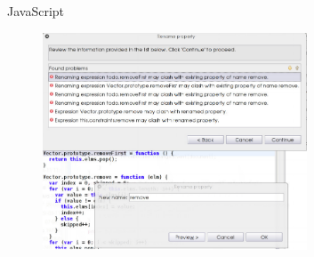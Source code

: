 \documentclass[xcolor=dvipsnames]{beamer}
\begin{document}
\begin{frame}{JavaScript}
  \begin{figure}[htbp]
    \centering
    \includegraphics[width=0.7\textwidth]{img/Javascript.png}
    \label{fig:JavaScript}
  \end{figure}
\end{frame}
\end{document}
